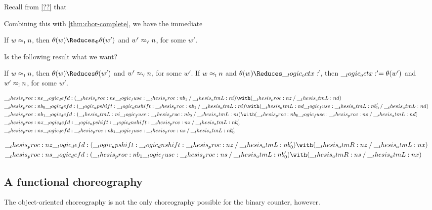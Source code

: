 Recall from \cref{??} that 

Combining this with \cref{thm:chor-complete}, we have the immediate 
\begin{corollary}
  If $w \approx\sb{\text{\normalfont\scshape i}} n$, then $\theta(w) \Reduces_{\orsig} \theta(w')$ and $w' \approx\sb{\text{\normalfont\scshape v}} n$, for some $w'$.
\end{corollary}


Is the following result what we want?
\begin{corollary}
  If $w \approx\sb{\text{\normalfont\scshape i}} n$, then $\theta(w) \Reduces \theta(w')$ and $w' \approx\sb{\text{\normalfont\scshape v}} n$, for some $w'$.
  If $w \approx\sb{\text{\normalfont\scshape i}} n$ and $\theta(w) \Reduces \octx'$, then $\__logic_octx:' = \theta(w')$ and $w' \approx\sb{\text{\normalfont\scshape i}} n$, for some $w'$.
\end{corollary}


\begin{equation*}
  \begin{lgathered}
    \proc{e} \defd (\proc{e} \fuse \proc{b}_1 \pmir \atmL{i}) \with (\proc{z} \pmir \atmL{d}) \\
    \proc{b}_0 \defd (\up \dn \proc{b}_1 \pmir \atmL{i}) \with (\atmL{d} \fuse \atmL{b}'_0 \pmir \atmL{d}) \\
    \proc{b}_1 \defd (\atmL{i} \fuse \proc{b}_0 \pmir \atmL{i}) \with (\proc{b}_0 \fuse \proc{s} \pmir \atmL{d}) \\
    \proc{z} \defd \up \dn \proc{z} \pmir \atmL{b}'_0 \\
    \proc{s} \defd \proc{b}_1 \fuse \proc{s} \pmir \atmL{b}'_0
  \end{lgathered}
\end{equation*}


\begin{equation*}
  \begin{lgathered}
    \proc{z} \defd (\up \dn \proc{z} \pmir \atmL{b}'_0) \with (\atmR{z} \pmir \atmL{x}) \\
    \proc{s} \defd (\proc{b}_1 \fuse \proc{s} \pmir \atmL{b}'_0) \with (\atmR{s} \pmir \atmL{x})
  \end{lgathered}
\end{equation*}

\clearpage
\subsection{A functional choreography}

The object-oriented choreography is not the only choreography possible for the binary counter, however.

